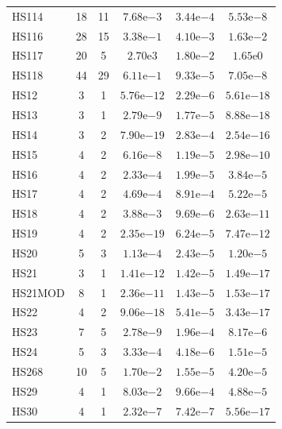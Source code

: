 \documentclass[11pt]{article}
\begin{document}
\begin{center}
\begin{longtable}{lccccc}
HS114 & 18 & 11 & $7.68\mathrm{e}{-3}$ & $3.44\mathrm{e}{-4}$ & $5.53\mathrm{e}{-8}$ \\
HS116 & 28 & 15 & $3.38\mathrm{e}{-1}$ & $4.10\mathrm{e}{-3}$ & $1.63\mathrm{e}{-2}$ \\
HS117 & 20 & 5 & $2.70\mathrm{e}{3}$ & $1.80\mathrm{e}{-2}$ & $1.65\mathrm{e}{0}$ \\
HS118 & 44 & 29 & $6.11\mathrm{e}{-1}$ & $9.33\mathrm{e}{-5}$ & $7.05\mathrm{e}{-8}$ \\
HS12 & 3 & 1 & $5.76\mathrm{e}{-12}$ & $2.29\mathrm{e}{-6}$ & $5.61\mathrm{e}{-18}$ \\
HS13 & 3 & 1 & $2.79\mathrm{e}{-9}$ & $1.77\mathrm{e}{-5}$ & $8.88\mathrm{e}{-18}$ \\
HS14 & 3 & 2 & $7.90\mathrm{e}{-19}$ & $2.83\mathrm{e}{-4}$ & $2.54\mathrm{e}{-16}$ \\
HS15 & 4 & 2 & $6.16\mathrm{e}{-8}$ & $1.19\mathrm{e}{-5}$ & $2.98\mathrm{e}{-10}$ \\
HS16 & 4 & 2 & $2.33\mathrm{e}{-4}$ & $1.99\mathrm{e}{-5}$ & $3.84\mathrm{e}{-5}$ \\
HS17 & 4 & 2 & $4.69\mathrm{e}{-4}$ & $8.91\mathrm{e}{-4}$ & $5.22\mathrm{e}{-5}$ \\
HS18 & 4 & 2 & $3.88\mathrm{e}{-3}$ & $9.69\mathrm{e}{-6}$ & $2.63\mathrm{e}{-11}$ \\
HS19 & 4 & 2 & $2.35\mathrm{e}{-19}$ & $6.24\mathrm{e}{-5}$ & $7.47\mathrm{e}{-12}$ \\
HS20 & 5 & 3 & $1.13\mathrm{e}{-4}$ & $2.43\mathrm{e}{-5}$ & $1.20\mathrm{e}{-5}$ \\
HS21 & 3 & 1 & $1.41\mathrm{e}{-12}$ & $1.42\mathrm{e}{-5}$ & $1.49\mathrm{e}{-17}$ \\
HS21MOD & 8 & 1 & $2.36\mathrm{e}{-11}$ & $1.43\mathrm{e}{-5}$ & $1.53\mathrm{e}{-17}$ \\
HS22 & 4 & 2 & $9.06\mathrm{e}{-18}$ & $5.41\mathrm{e}{-5}$ & $3.43\mathrm{e}{-17}$ \\
HS23 & 7 & 5 & $2.78\mathrm{e}{-9}$ & $1.96\mathrm{e}{-4}$ & $8.17\mathrm{e}{-6}$ \\
HS24 & 5 & 3 & $3.33\mathrm{e}{-4}$ & $4.18\mathrm{e}{-6}$ & $1.51\mathrm{e}{-5}$ \\
HS268 & 10 & 5 & $1.70\mathrm{e}{-2}$ & $1.55\mathrm{e}{-5}$ & $4.20\mathrm{e}{-5}$ \\
HS29 & 4 & 1 & $8.03\mathrm{e}{-2}$ & $9.66\mathrm{e}{-4}$ & $4.88\mathrm{e}{-5}$ \\
HS30 & 4 & 1 & $2.32\mathrm{e}{-7}$ & $7.42\mathrm{e}{-7}$ & $5.56\mathrm{e}{-17}$ \\

\end{longtable}
\end{center}
\end{document}
